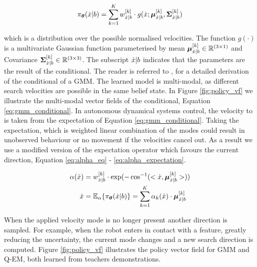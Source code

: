 \begin{equation}\label{eq:gmm_conditional}
 \pi_{\boldsymbol{\theta}}(\dot{x}|b) = \sum_{k=1}^{K} w^{[k]}_{\dot{x}|b} \cdot g(\dot{x};\boldsymbol{\mu}^{[k]}_{\dot{x}|b},\boldsymbol{\Sigma}^{[k]}_{\dot{x}|b}) 
 \end{equation}


 
which is a distribution over the possible normalised velocities. The function $g(\cdot)$ is a multivariate
Gaussian function parameterised by mean $\boldsymbol{\mu}^{[k]}_{\dot{x}|b} \in \mathbb{R}^{(3\times1)}$ and Covariance $\boldsymbol{\Sigma}^{[k]}_{\dot{x}|b} \in \mathbb{R}^{(3\times3)}$. The subscript $\dot{x}|b$ indicates that the parameters 
are the result of the conditional. The reader is referred to \cite{gesture_calinon_2010}, \cite{gmr_2004} for 
a detailed derivation of the conditional of a GMM. The learned model 
is multi-modal, as different search velocities are possible 
in the same belief state. In Figure \ref{fig:policy_vf} we illustrate the multi-modal 
vector fields of the conditional, Equation \ref{eq:gmm_conditional}.
In autonomous dynamical systems control, the velocity to is taken from 
the expectation of Equation \ref{eq:gmm_conditional}. Taking the expectation, which is weighted 
linear combination of the modes could result in unobserved behaviour or no movement if the velocities cancel out. 
As a result we use a modified version of the expectation operator which favours the current
direction, Equation \ref{eq:alpha_eq} - \ref{eq:alpha_expectation}.

\begin{align}
 \alpha(\dot{x}) &= w^{[k]}_{\dot{x}|b} \cdot \exp(-\cos^{-1}(<\dot{x},\boldsymbol{\mu}^{[k]}_{\dot{x}|b}>)) \label{eq:alpha_eq}\\
 \dot{x} &= \mathbb{E}_{\alpha}\{\pi_{\boldsymbol{\theta}}(\dot{x}|b)\} = \sum_{k=1}^K \alpha_k(\dot{x}) \cdot \boldsymbol{\mu}^{[k]}_{\dot{x}|b} \label{eq:alpha_expectation}
\end{align}

When the applied velocity mode is no longer present another direction is sampled. For example, when the robot enters in contact 
with a feature, greatly reducing the uncertainty, the current mode changes and a new search direction is computed. 
Figure \ref{fig:policy_vf} illustrates the policy vector field for GMM and Q-EM, both learned from teachers demonstrations.


